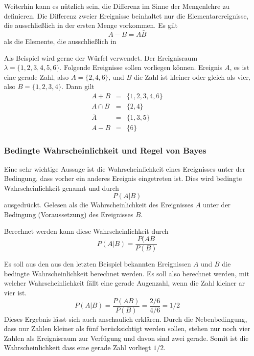 Weiterhin kann es nützlich sein, die Differenz im Sinne der
Mengenlehre zu definieren. Die Differenz zweier Ereignisse
beinhaltet nur die Elementarereignisse, die ausschließlich in der
ersten Menge vorkommen. Es gilt
\begin{equation}\label{eq:Def:DiffWahrscheinlichkeit}
    A-B = A\bar{B}
\end{equation}
 als die Elemente, die ausschließlich in

\begin{example}
Als Beispiel wird gerne der Würfel verwendet. Der Ereignisraum
$\lambda = \{1,2,3,4,5,6\}$. Folgende Ereignisse sollen vorliegen
können. Ereignis $A$, es ist eine gerade Zahl, also $A =
\{2,4,6\}$, und $B$ die Zahl ist kleiner oder gleich als vier,
also $B = \{1,2,3,4\}$. Dann gilt
\begin{eqnarray}
A+B &=& \{1,2,3,4,6 \}\\
A\cap B & = & \{2,4\}\\
\bar{A} &= & \{1,3,5\}\\
A-B & = & \{6 \}
\end{eqnarray}
\end{example}

\subsubsection{Bedingte Wahrscheinlichkeit und Regel von Bayes}
Eine sehr wichtige Aussage ist die Wahrscheinlichkeit eines
Ereignisses unter der Bedingung, dass vorher ein anderes Ereignis
eingetreten ist. Dies wird bedingte Wahrscheinlichkeit genannt und
durch
\begin{equation}\label{eq:Def:NameBEdingteWahr}
    P(A|B)
\end{equation}
ausgedrückt. Gelesen als die Wahrscheinlichkeit des Ereignisses
$A$ unter der Bedingung (Voraussetzung) des Ereignisses $B$.

Berechnet werden kann diese Wahrscheinlichkeit durch
\begin{equation}\label{eg:Def:BedingteWahr}
    P(A|B) = \frac{P(A B}{P(B)}
\end{equation}

\begin{example}
Es soll aus den aus den letzten Beispiel bekannten Ereignissen $A$
und $B$ die bedingte Wahrscheinlichkeit berechnet werden. Es soll
also berechnet werden, mit welcher Wahrscheinlichkeit fällt eine
gerade Augenzahl, wenn die Zahl kleiner ar vier ist.
\begin{equation}
    P(A|B) = \frac{P(AB)}{P(B)} = \frac{2/6}{4/6} = 1/2
\end{equation}
Dieses Ergebnis lässt sich auch anschaulich erklären. Durch die
Nebenbedingung, dass nur Zahlen kleiner als fünf berücksichtigt
werden sollen, stehen nur noch vier Zahlen als Ereignisraum zur
Verfügung und davon sind zwei gerade. Somit ist die
Wahrscheinlichkeit dass eine gerade Zahl vorliegt $1/2$.
\end{example}

